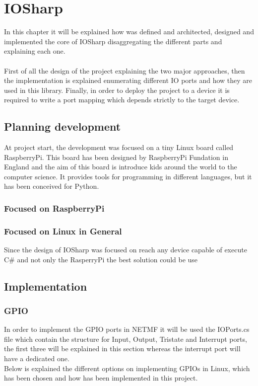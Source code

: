 \chapter{IOSharp}\label{C:IOSharp development}

In this chapter it will be explained how was defined and architected, designed and implemented the core of IOSharp disaggregating the different parts and explaining each one.
\\
\\
First of all the design of the project explaining the two major approaches, then the implementation is explained enumerating different IO ports and how they are used in this library. Finally, in order to deploy the project to a device it is required to write a port mapping which depends strictly to the target device.

\section{Planning development}\label{S:Design}
At project start, the development was focused on a tiny Linux board called RaspberryPi. This board has been designed by RaspberryPi Fundation in England and the aim of this board is introduce kids around the world to the computer science. It provides tools for programming in different languages, but it has been conceived for Python.

\subsection{Focused on RaspberryPi}\label{SS:}
\subsection{Focused on Linux in General}\label{SS:}
Since the design of IOSharp was focused on reach any device capable of execute C\# and not only the RasperryPi the best solution could be use 

\section{Implementation}\label{S:Implementation}
\subsection{GPIO}\label{SS:GPIO}
In order to implement the GPIO ports in NETMF it will be used the IOPorts.cs file which contain the structure for Input, Output, Tristate and Interrupt ports, the first three will be explained in this section whereas the interrupt port will have a dedicated one.
\\
Below is explained the different options on implementing GPIOs in Linux, which has been chosen and how has been implemented in this project.

